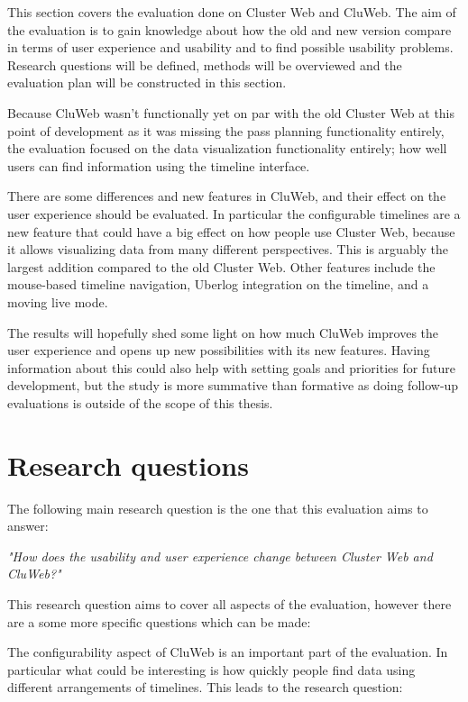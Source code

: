 
This section covers the evaluation done on Cluster Web and CluWeb. The aim of the evaluation is to gain knowledge about how the old and new version compare in terms of user experience and usability and to find possible usability problems. Research questions will be defined, methods will be overviewed and the evaluation plan will be constructed in this section.

Because CluWeb wasn't functionally yet on par with the old Cluster Web at this point of development as it was missing the pass planning functionality entirely, the evaluation focused on the data visualization functionality entirely; how well users can find information using the timeline interface.

There are some differences and new features in CluWeb, and their effect on the user experience should be evaluated. In particular the configurable timelines are a new feature that could have a big effect on how people use Cluster Web, because it allows visualizing data from many different perspectives. This is arguably the largest addition compared to the old Cluster Web. Other features include the mouse-based timeline navigation, Uberlog integration on the timeline, and a moving live mode.

The results will hopefully shed some light on how much CluWeb improves the user experience and opens up new possibilities with its new features. Having information about this could also help with setting goals and priorities for future development, but the study is more summative than formative as doing follow-up evaluations is outside of the scope of this thesis. \cite{albert2013measuring}

\section{Research questions} \label{research_questions}
The following main research question is the one that this evaluation aims to answer:

\textit{"How does the usability and user experience change between Cluster Web and CluWeb?"}

This research question aims to cover all aspects of the evaluation, however there are a some more specific questions which can be made:

The configurability aspect of CluWeb is an important part of the evaluation. In particular what could be interesting is how quickly people find data using different arrangements of timelines. This leads to the research question:

